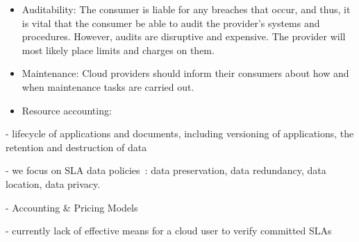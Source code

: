 \begin{itemize}
 \item Auditability: The consumer is liable for any breaches that occur, and thus, it is  vital that the consumer be able to audit the provider's systems and procedures. However, audits are disruptive and expensive. The provider will most likely place limits and charges on them.
 
 \item Maintenance: Cloud providers should inform their consumers about how and when maintenance tasks are carried out.

 \item Resource accounting:
\end{itemize}

- lifecycle of applications and documents, including versioning of applications, the retention and destruction of data 


- we focus on SLA data policies~\cite{Mee12}: data preservation, data redundancy, data location, data privacy.



- Accounting \& Pricing Models~\cite{MMS13}


- currently lack of effective means for a cloud user to verify committed SLAs

